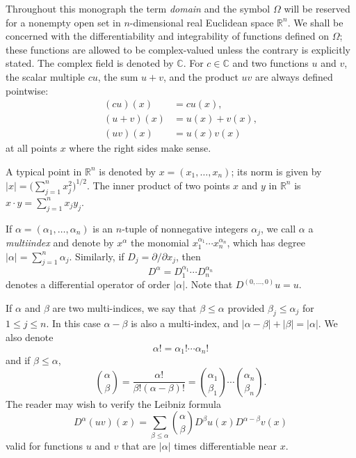 \begin{para}
  Throughout this monograph the term \emph{domain} and the symbol
  $\Omega$ will be reserved for a nonempty open set in $n$-dimensional
  real Euclidean space $\mathbb{R}^n$.
  We shall be concerned with the differentiability and integrability
  of functions defined on $\Omega$; these functions are allowed to be
  complex-valued unless the contrary is explicitly stated. The complex
  field is denoted by $\mathbb{C}$. For $c\in\mathbb{C}$ and two functions
  $u$ and $v$, the scalar multiple $cu$, the sum $u+v$,
  and the product $uv$ are always defined pointwise:
  \begin{align*}
    (cu)(x) & = cu(x), \\
    (u+v)(x) & = u(x) + v(x), \\
    (uv)(x) & = u(x)v(x)
  \end{align*}
  at all points $x$ where the right sides make sense.

  A typical point in $\mathbb{R}^n$ is denoted by $x=(x_1,\dots,x_n)$;
  its norm is given by $|x| = \bigl(\sum_{j=1}^n x_j^2\bigr)^{1/2}$.
  The inner product of two points $x$ and $y$ in $\mathbb{R}^n$ is
  $x\cdot y = \sum_{j=1}^n x_jy_j$.

  If $\alpha = (\alpha_1,\dots,\alpha_n)$ is an $n$-tuple of nonnegative
  integers $\alpha_j$, we call $\alpha$ a \emph{multiindex} and denote
  by $x^{\alpha}$ the monomial $x_1^{\alpha_1}\cdots x_n^{\alpha_n}$,
  which has degree $|\alpha| = \sum_{j=1}^n \alpha_j$.
  Similarly, if $D_j=\partial/\partial x_j$, then
  \[D^{\alpha} = D_1^{\alpha_1}\cdots D_n^{\alpha_n}\]
  denotes a differential operator of order $|\alpha|$.
  Note that $D^{(0,\dots,0)}u=u$.

  If $\alpha$ and $\beta$ are two multi-indices, we say that $\beta\leq\alpha$
  provided $\beta_j\leq \alpha_j$ for $1\leq j\leq n$.
  In this case $\alpha-\beta$ is also a multi-index, and
  $|\alpha-\beta| + |\beta| = |\alpha|$. We also denote
  \[\alpha! = \alpha_1!\cdots\alpha_n!\]
  and if $\beta\leq\alpha$,
  \[\binom{\alpha}{\beta} = \frac{\alpha!}{\beta!(\alpha-\beta)!}
    = \binom{\alpha_1}{\beta_1}\cdots\binom{\alpha_n}{\beta_n}.\]
  The reader may wish to verify the Leibniz formula
  \[D^{\alpha}(uv)(x) = \sum_{\beta\leq\alpha} \binom{\alpha}{\beta}
    D^{\beta} u(x) D^{\alpha-\beta} v(x)\]
    valid for functions $u$ and $v$ that are $|\alpha|$ times differentiable
    near $x$.
\end{para}



